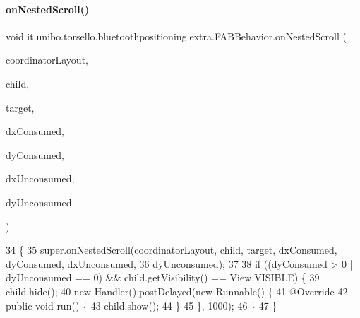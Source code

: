 \paragraph{\texorpdfstring{on\+Nested\+Scroll()}{onNestedScroll()}}
{\footnotesize\ttfamily void it.\+unibo.\+torsello.\+bluetoothpositioning.\+extra.\+F\+A\+B\+Behavior.\+on\+Nested\+Scroll (\begin{DoxyParamCaption}\item[{Coordinator\+Layout}]{coordinator\+Layout,  }\item[{final Floating\+Action\+Button}]{child,  }\item[{View}]{target,  }\item[{int}]{dx\+Consumed,  }\item[{int}]{dy\+Consumed,  }\item[{int}]{dx\+Unconsumed,  }\item[{int}]{dy\+Unconsumed }\end{DoxyParamCaption})}


\begin{DoxyCode}
34                                                                                                            
           \{
35         super.onNestedScroll(coordinatorLayout, child, target, dxConsumed, dyConsumed, dxUnconsumed,
36                 dyUnconsumed);
37 
38         \textcolor{keywordflow}{if} ((dyConsumed > 0 || dyUnconsumed == 0) && child.getVisibility() == View.VISIBLE) \{
39             child.hide();
40             \textcolor{keyword}{new} Handler().postDelayed(\textcolor{keyword}{new} Runnable() \{
41                 @Override
42                 \textcolor{keyword}{public} \textcolor{keywordtype}{void} run() \{
43                     child.show();
44                 \}
45             \}, 1000);
46         \}
47     \}
\end{DoxyCode}
\hypertarget{classit_1_1unibo_1_1torsello_1_1bluetoothpositioning_1_1extra_1_1FABBehavior_a5c6501a08ec79dd6bd92106b72c14979_a5c6501a08ec79dd6bd92106b72c14979}{}\label{classit_1_1unibo_1_1torsello_1_1bluetoothpositioning_1_1extra_1_1FABBehavior_a5c6501a08ec79dd6bd92106b72c14979_a5c6501a08ec79dd6bd92106b72c14979} 
